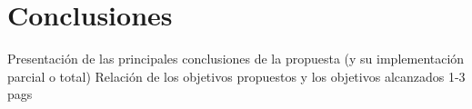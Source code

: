 \chapter{Conclusiones}

Presentación de las principales conclusiones de la
propuesta (y su implementación parcial o total)
Relación de los objetivos propuestos y los objetivos
alcanzados
1-3 pags